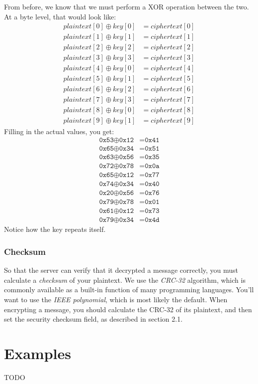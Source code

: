 \documentclass{report}
\newcommand{\code}[1]{\texttt{#1}}
\newcommand*\xor{\oplus}
\begin{document}
From before, we know that we must perform a XOR operation between the two. At a byte level, that would look like:
\begin{equation*}
\begin{split}
	plaintext[0] \xor key[0] &= ciphertext[0] \\
	plaintext[1] \xor key[1] &= ciphertext[1] \\
	plaintext[2] \xor key[2] &= ciphertext[2] \\
	plaintext[3] \xor key[3] &= ciphertext[3] \\
	plaintext[4] \xor key[0] &= ciphertext[4] \\
	plaintext[5] \xor key[1] &= ciphertext[5] \\
	plaintext[6] \xor key[2] &= ciphertext[6] \\
	plaintext[7] \xor key[3] &= ciphertext[7] \\
	plaintext[8] \xor key[0] &= ciphertext[8] \\
	plaintext[9] \xor key[1] &= ciphertext[9]
\end{split}
\end{equation*}
Filling in the actual values, you get:
\begin{equation*}
\begin{split}
	\code{0x53} \xor \code{0x12} &= \code{0x41} \\
	\code{0x65} \xor \code{0x34} &= \code{0x51} \\
	\code{0x63} \xor \code{0x56} &= \code{0x35} \\
	\code{0x72} \xor \code{0x78} &= \code{0x0a} \\
	\code{0x65} \xor \code{0x12} &= \code{0x77} \\
	\code{0x74} \xor \code{0x34} &= \code{0x40} \\
	\code{0x20} \xor \code{0x56} &= \code{0x76} \\
	\code{0x79} \xor \code{0x78} &= \code{0x01} \\
	\code{0x61} \xor \code{0x12} &= \code{0x73} \\
	\code{0x79} \xor \code{0x34} &= \code{0x4d}
\end{split}
\end{equation*}
Notice how the key repeats itself.

\subsection{Checksum}
So that the server can verify that it decrypted a message correctly, you must calculate a \emph{checksum} of your plaintext.
We use the \emph{CRC-32} algorithm, which is commonly available as a built-in function of many programming languages.
You'll want to use the \emph{IEEE polynomial}, which is most likely the default.
When encrypting a message, you should calculate the CRC-32 of its plaintext, and then set the security checksum field, as described in section 2.1.

\chapter{Examples}
TODO
\end{document}
